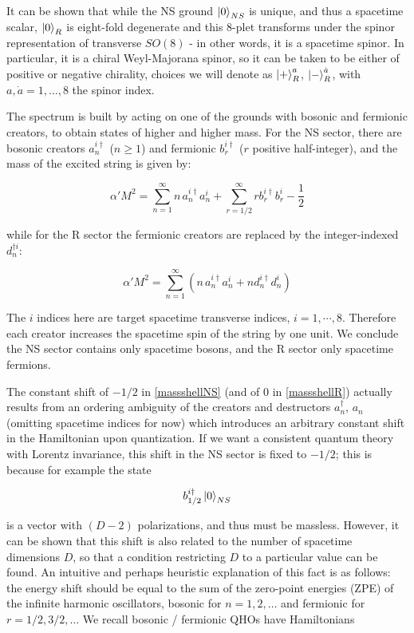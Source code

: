 It can be shown that while the NS ground $\ket{0}_{NS}$ is unique, and thus a spacetime scalar, $\ket{0}_R$ is eight-fold degenerate and this 8-plet transforms under the spinor representation of transverse $SO(8)$ - in other words, it is a spacetime spinor. In particular, it is a chiral Weyl-Majorana spinor, so it can be taken to be either of positive or negative chirality, choices we will denote as $\ket{+}^a_R$, $\ket{-}^{\dot a}_R$, with $a,\dot{a}=1,\ldots,8$ the spinor index.

The spectrum is built by acting on one of the grounds with bosonic and fermionic creators, to obtain states of higher and higher mass. For the NS sector, there are bosonic creators $a_n^{i\dagger}$ ($n\geq 1$) and fermionic $b_r^{i\dagger}$ ($r$ positive half-integer), and the mass of the excited string is given by:

\begin{equation}
	\alpha' M^2 = \sum_{n=1}^\infty n \,a_n^{i\dagger} a_n^i  + \sum_{r=1/2}^\infty r b_r^{i\dagger} b_r^i - \frac{1}{2}
	\label{massshellNS}
\end{equation}

while for the R sector the fermionic creators are replaced by the integer-indexed $d_n^{\dagger i}$:

\begin{equation}
	\alpha' M^2 = \sum_{n=1}^\infty \left(n\, a_n^{i\dagger} a_n^i + n d_n^{i\dagger} d_n^i \right)
	\label{massshellR}
\end{equation}

The $i$ indices here are target spacetime transverse indices, $i=1,\cdots,8$. Therefore each creator increases the spacetime spin of the string by one unit. We conclude the NS sector contains only spacetime bosons, and the R sector only spacetime fermions.

The constant shift of $-1/2$ in \eqref{massshellNS} (and of $0$ in \eqref{massshellR}) actually results from an ordering ambiguity of the creators and destructors $a_n^\dagger$, $a_n$ (omitting spacetime indices for now) which introduces an arbitrary constant shift in the Hamiltonian upon quantization. If we want a consistent quantum theory with Lorentz invariance, this shift in the NS sector is fixed to $-1/2$; this is because for example the state

\begin{equation}
	b_{1/2}^{i\dagger} \ket{0}_{NS}
	\label{}
\end{equation}

is a vector with $(D-2)$ polarizations, and thus must be massless. However, it can be shown that this shift is also related to the number of spacetime dimensions $D$, so that a condition restricting $D$ to a particular value can be found. An intuitive and perhaps heuristic explanation of this fact is as follows: the energy shift should be equal to the sum of the zero-point energies (ZPE) of the infinite harmonic oscillators, bosonic for $n = 1, 2, \ldots $  and fermionic for $r= 1/2, 3/2, \ldots$ We recall bosonic / fermionic QHOs have Hamiltonians

